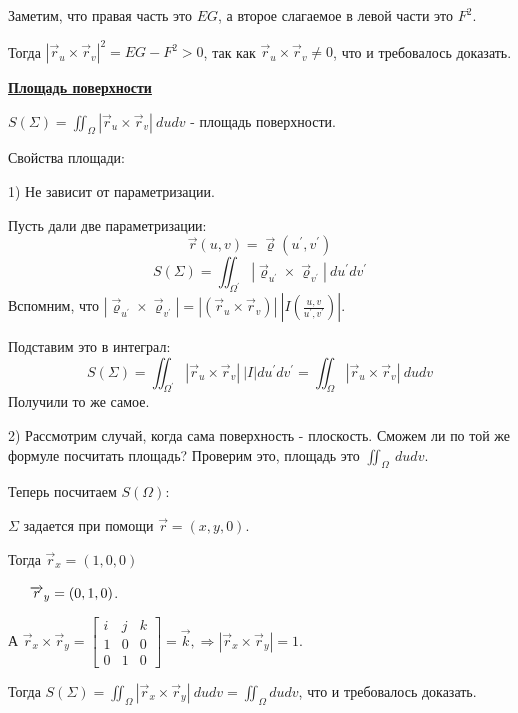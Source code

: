 \documentclass[12pt]{article}
\begin{document}
Заметим, что правая часть это $EG$, а второе слагаемое в левой части это $F^2$.\par
Тогда $|\overrightarrow{r}_u \times \overrightarrow{r}_v|^2 = EG-F^2 > 0$, так как $\overrightarrow{r}_u \times \overrightarrow{r}_v \neq 0$, что и требовалось доказать.\par
\uline{\textbf{Площадь поверхности}}\par\par
$S(\Sigma) = \iint_\Omega |\overrightarrow{r}_u \times \overrightarrow{r}_v| \ du dv$ - площадь поверхности.\par
Свойства площади:\par
1) Не зависит от параметризации.\par
Пусть дали две параметризации:
$$\overrightarrow{r}(u,v) = \overrightarrow{\varrho}(u^{'},v^{'})$$
$$S(\Sigma) = \iint_{\Omega^{'}} |\overrightarrow{\varrho}_{u^{'}} \times \overrightarrow{\varrho}_{v^{'}}| \ du^{'} dv^{'}$$
Вспомним, что $|\overrightarrow{\varrho}_{u^{'}} \times \overrightarrow{\varrho}_{v^{'}}| = |(\overrightarrow{r}_u \times \overrightarrow{r}_v)| \ |I(\frac{u,v}{u^{'},v^{'}})|$.\par
Подставим это в интеграл:
$$S(\Sigma) = \iint_{\Omega^{'}} |\overrightarrow{r}_u \times \overrightarrow{r}_v| \ |I| du^{'} dv^{'} = \iint_\Omega |\overrightarrow{r}_u \times \overrightarrow{r}_v| \ dudv$$
Получили то же самое.\par
2) Рассмотрим случай, когда сама поверхность - плоскость. Сможем ли по той же формуле посчитать площадь? Проверим это, площадь это $\iint_\Omega \ dudv$.\par
Теперь посчитаем $S(\Omega):$\par
$\Sigma$ задается при помощи $\overrightarrow{r} = (x,y,0)$.\par
Тогда $\overrightarrow{r}_x = (1,0,0)$\par
$\indent \overrightarrow{r}_y = (0,1,0)$.\par
А $\overrightarrow{r}_x \times \overrightarrow{r}_y = \begin{bmatrix} i & j & k \\ 1 & 0 & 0 \\ 0 & 1 & 0 \end{bmatrix} = \overrightarrow{k}, \Rightarrow |\overrightarrow{r}_x \times \overrightarrow{r}_y | = 1$.\par
Тогда $S(\Sigma) = \iint_\Omega |\overrightarrow{r}_x \times \overrightarrow{r}_y| \ du dv = \iint_\Omega du dv$, что и требовалось доказать.\par
\end{document}
